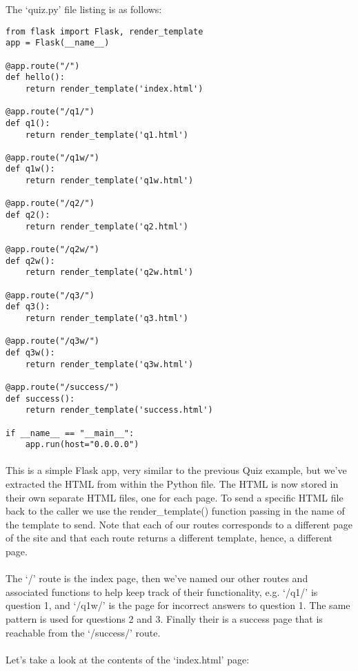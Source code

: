 The `quiz.py' file listing is as follows:

\begin{lstlisting}
from flask import Flask, render_template
app = Flask(__name__)

@app.route("/")
def hello():
    return render_template('index.html')

@app.route("/q1/")
def q1():
    return render_template('q1.html')

@app.route("/q1w/")
def q1w():
    return render_template('q1w.html')

@app.route("/q2/")
def q2():
    return render_template('q2.html')

@app.route("/q2w/")
def q2w():
    return render_template('q2w.html')

@app.route("/q3/")
def q3():
    return render_template('q3.html')

@app.route("/q3w/")
def q3w():
    return render_template('q3w.html')

@app.route("/success/")
def success():
    return render_template('success.html')
    
if __name__ == "__main__":
    app.run(host="0.0.0.0")
\end{lstlisting}

\paragraph{} This is a simple Flask app, very similar to the previous Quiz example, but we've extracted the HTML from within the Python file. The HTML is now stored in their own separate HTML files, one for each page. To send a specific HTML file back to the caller we use the render\_template() function passing in the name of the template to send. Note that each of our routes corresponds to a different page of the site and that each route returns a different template, hence, a different page.

\paragraph{} The `/' route is the index page, then we've named our other routes and associated functions to help keep track of their functionality, e.g. `/q1/' is question 1, and `/q1w/' is the page for incorrect answers to question 1. The same pattern is used for questions 2 and 3. Finally their is a success page that is reachable from the `/success/' route.

\paragraph{} Let's take a look at the contents of the `index.html' page:


